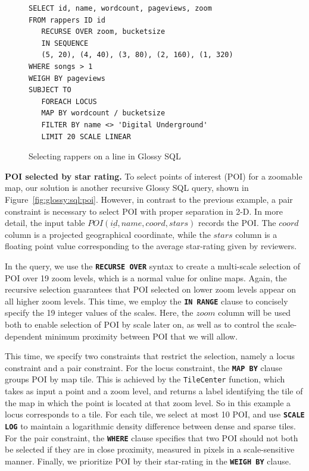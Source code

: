 \documentclass[11pt, oneside]{report}
\newcommand{\minisec}[1]{\noindent\textbf{#1.}}
\begin{document}
{%
\begin{figure}[!t]
\begin{center}
\begin{lstlisting}
SELECT id, name, wordcount, pageviews, zoom
FROM rappers ID id
   RECURSE OVER zoom, bucketsize 
   IN SEQUENCE 
   (5, 20), (4, 40), (3, 80), (2, 160), (1, 320)
WHERE songs > 1
WEIGH BY pageviews
SUBJECT TO
   FOREACH LOCUS
   MAP BY wordcount / bucketsize
   FILTER BY name <> 'Digital Underground'
   LIMIT 20 SCALE LINEAR
\end{lstlisting}
\vspace*{-2ex}
\caption{Selecting rappers on a line in Glossy SQL}
\label{fig:glossy:sql:rappers}
\end{center}
\vspace*{-5ex}
\end{figure}

\minisec{POI selected by star rating}
To select points of interest (POI) for a zoomable map, our solution is another recursive Glossy SQL query, shown in Figure~\ref{fig:glossy:sql:poi}. However, in contrast to the previous example, a pair constraint is necessary to select POI with proper separation in 2-D. 
In more detail, the input table $POI(\underline{id}, name, coord, stars)$ records the POI. The $coord$ column is a projected geographical coordinate, while the $stars$ column is a floating point value corresponding to the average star-rating given by reviewers.

In the query, we use the \textbf{\texttt{RECURSE OVER}} syntax to create a multi-scale selection of POI over 19 zoom levels, which is a normal value for online maps. Again, the recursive selection guarantees that POI selected on lower zoom levels appear on all higher zoom levels. This time, we employ the \textbf{\texttt{IN RANGE}} clause to concisely specify the 19 integer values of the scales. Here, the $zoom$ column will be used both to enable selection of POI by scale later on, as well as to control the scale-dependent minimum proximity between POI that we will allow.

This time, we specify two constraints that restrict the selection, namely a locus constraint and a pair constraint. For the locus constraint, the \textbf{\texttt{MAP BY}} clause groups POI by map tile. This is achieved by the \texttt{TileCenter} function, which takes as input a point and a zoom level, and returns a label identifying the tile of the map in which the point is located at that zoom level. So in this example a locus corresponds to a tile. For each tile, we select at most 10 POI, and use \textbf{\texttt{SCALE LOG}} to maintain a logarithmic density difference between dense and sparse tiles. For the pair constraint, the \textbf{\texttt{WHERE}} clause specifies that two POI should not both be selected if they are in close proximity, measured in pixels in a scale-sensitive manner. Finally, we prioritize POI by their star-rating in the \textbf{\texttt{WEIGH BY}} clause. 

}
\end{document}
